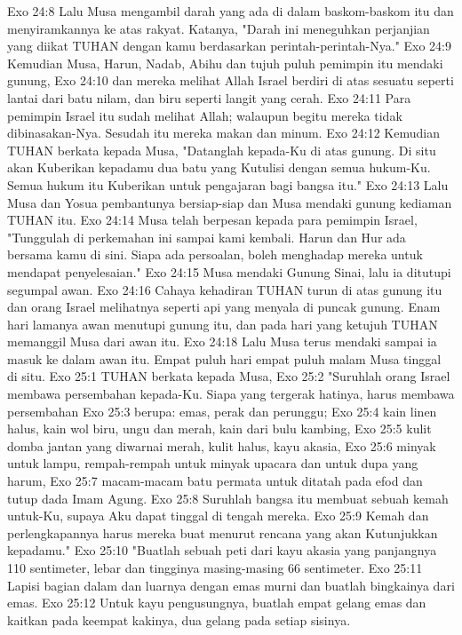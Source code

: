 Exo 24:8  Lalu Musa mengambil darah yang ada di dalam baskom-baskom itu dan menyiramkannya ke atas rakyat. Katanya, "Darah ini meneguhkan perjanjian yang diikat TUHAN dengan kamu berdasarkan perintah-perintah-Nya."
Exo 24:9  Kemudian Musa, Harun, Nadab, Abihu dan tujuh puluh pemimpin itu mendaki gunung,
Exo 24:10  dan mereka melihat Allah Israel berdiri di atas sesuatu seperti lantai dari batu nilam, dan biru seperti langit yang cerah.
Exo 24:11  Para pemimpin Israel itu sudah melihat Allah; walaupun begitu mereka tidak dibinasakan-Nya. Sesudah itu mereka makan dan minum.
Exo 24:12  Kemudian TUHAN berkata kepada Musa, "Datanglah kepada-Ku di atas gunung. Di situ akan Kuberikan kepadamu dua batu yang Kutulisi dengan semua hukum-Ku. Semua hukum itu Kuberikan untuk pengajaran bagi bangsa itu."
Exo 24:13  Lalu Musa dan Yosua pembantunya bersiap-siap dan Musa mendaki gunung kediaman TUHAN itu.
Exo 24:14  Musa telah berpesan kepada para pemimpin Israel, "Tunggulah di perkemahan ini sampai kami kembali. Harun dan Hur ada bersama kamu di sini. Siapa ada persoalan, boleh menghadap mereka untuk mendapat penyelesaian."
Exo 24:15  Musa mendaki Gunung Sinai, lalu ia ditutupi segumpal awan.
Exo 24:16  Cahaya kehadiran TUHAN turun di atas gunung itu dan orang Israel melihatnya seperti api yang menyala di puncak gunung. Enam hari lamanya awan menutupi gunung itu, dan pada hari yang ketujuh TUHAN memanggil Musa dari awan itu.
Exo 24:18  Lalu Musa terus mendaki sampai ia masuk ke dalam awan itu. Empat puluh hari empat puluh malam Musa tinggal di situ.
Exo 25:1  TUHAN berkata kepada Musa,
Exo 25:2  "Suruhlah orang Israel membawa persembahan kepada-Ku. Siapa yang tergerak hatinya, harus membawa persembahan
Exo 25:3  berupa: emas, perak dan perunggu;
Exo 25:4  kain linen halus, kain wol biru, ungu dan merah, kain dari bulu kambing,
Exo 25:5  kulit domba jantan yang diwarnai merah, kulit halus, kayu akasia,
Exo 25:6  minyak untuk lampu, rempah-rempah untuk minyak upacara dan untuk dupa yang harum,
Exo 25:7  macam-macam batu permata untuk ditatah pada efod dan tutup dada Imam Agung.
Exo 25:8  Suruhlah bangsa itu membuat sebuah kemah untuk-Ku, supaya Aku dapat tinggal di tengah mereka.
Exo 25:9  Kemah dan perlengkapannya harus mereka buat menurut rencana yang akan Kutunjukkan kepadamu."
Exo 25:10  "Buatlah sebuah peti dari kayu akasia yang panjangnya 110 sentimeter, lebar dan tingginya masing-masing 66 sentimeter.
Exo 25:11  Lapisi bagian dalam dan luarnya dengan emas murni dan buatlah bingkainya dari emas.
Exo 25:12  Untuk kayu pengusungnya, buatlah empat gelang emas dan kaitkan pada keempat kakinya, dua gelang pada setiap sisinya.
